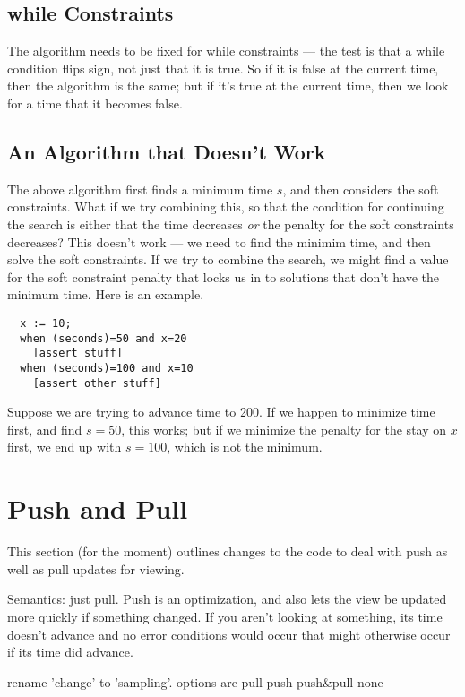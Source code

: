 \documentclass{article}
\begin{document}
\subsection{while Constraints}

The algorithm needs to be fixed for while constraints --- the
test is that a while condition flips sign, not just that it is true.
So if it is false at the current time, then the algorithm is the same;
but if it's true at the current time, then we look for a time that it
becomes false.

\subsection{An Algorithm that Doesn't Work}

The above algorithm first finds a minimum time $s$, and then considers
the soft constraints.  What if we try combining this, so that the
condition for continuing the search is either that the time decreases
\emph{or} the penalty for the soft constraints decreases?  This
doesn't work --- we need to find the minimim time, and then solve the
soft constraints.  If we try to combine the search, we might find a
value for the soft constraint penalty that locks us in to solutions
that don't have the minimum time.  Here is an example.

\begin{verbatim}
  x := 10;
  when (seconds)=50 and x=20
    [assert stuff]
  when (seconds)=100 and x=10
    [assert other stuff]
\end{verbatim}

Suppose we are trying to advance time to 200.  If we happen to
minimize time first, and find $s=50$, this works; but if we minimize
the penalty for the stay on $x$ first, we end up with $s=100$, which
is not the minimum.

\section{Push and Pull}

This section (for the moment) outlines changes to the code to deal with
push as well as pull updates for viewing.

Semantics: just pull.  Push is an optimization, and also lets the view be
updated more quickly if something changed.  If you aren't looking at
something, its time doesn't advance and no error conditions would occur
that might otherwise occur if its time did advance.

rename 'change' to 'sampling'.  options are
pull
push 
push\&pull
none
\end{document}
